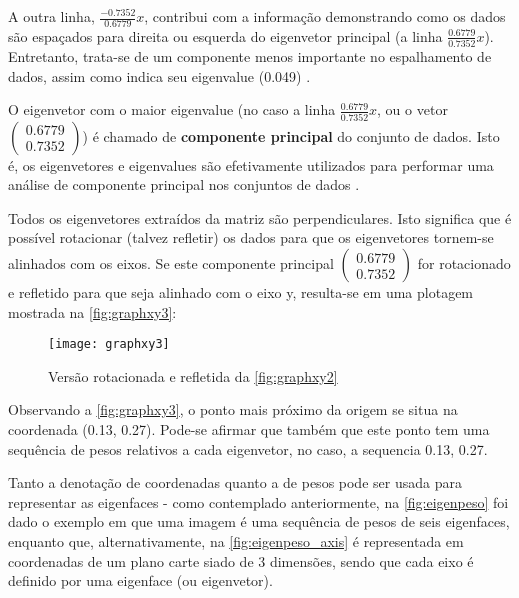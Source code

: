 A outra linha, $\frac{-0.7352}{0.6779}$$x$, contribui com a informação demonstrando como os dados são espaçados para direita ou esquerda do eigenvetor principal (a linha $\frac{0.6779}{0.7352}$$x$). Entretanto, trata-se de um componente menos importante no espalhamento de dados, assim como indica seu eigenvalue (0.049) \cite{drmathew_java_programming}.

O eigenvetor com o maior eigenvalue (no caso a linha $\frac{0.6779}{0.7352}$$x$, ou o vetor $\begin{pmatrix} 0.6779 \\ 0.7352 \end{pmatrix}$) é chamado de \textbf{componente principal} do conjunto de dados. Isto é, os eigenvetores e eigenvalues são efetivamente utilizados para performar uma análise de componente principal nos conjuntos de dados \cite{drmathew_java_programming}.

Todos os eigenvetores extraídos da matriz são perpendiculares. Isto significa que é possível rotacionar (talvez refletir) os dados para que os eigenvetores tornem-se alinhados com os eixos. Se este componente principal $\begin{pmatrix} 0.6779 \\ 0.7352 \end{pmatrix}$ for rotacionado e refletido para que seja alinhado com o eixo y, resulta-se em uma plotagem mostrada na \autoref{fig:graphxy3}:

\begin{figure}[h]
	\centering
	\texttt{[image: graphxy3]}
	\caption{Versão rotacionada e refletida da \autoref{fig:graphxy2}}
	\label{fig:graphxy3}
\end{figure}

Observando a \autoref{fig:graphxy3}, o ponto mais próximo da origem se situa na coordenada (0.13, 0.27). Pode-se afirmar que também que este ponto tem uma sequência de pesos relativos a cada eigenvetor, no caso, a sequencia {0.13, 0.27}.

Tanto a denotação de coordenadas quanto a de pesos pode ser usada para representar as eigenfaces - como contemplado anteriormente, na \autoref{fig:eigenpeso} foi dado o exemplo em que uma imagem é uma sequência de pesos de seis eigenfaces, enquanto que, alternativamente, na  \autoref{fig:eigenpeso_axis} é representada em coordenadas de um plano carte siado de 3 dimensões, sendo que cada eixo é definido por uma eigenface (ou eigenvetor).

